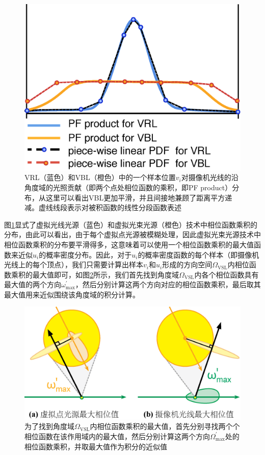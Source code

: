 \begin{figure}
	\sidecaption
	\includegraphics[width=.5\textwidth]{figures/ir/vbl-piece-wise-sampling}
	\caption{VRL（蓝色）和VBL（橙色）中的一个样本位置$v_i$对摄像机光线的沿角度域的光照贡献（即两个点处相位函数的乘积，即PF product）分布，从这里可以看出VBL更加平滑，并且间接地兼顾了距离平方递减。虚线线段表示对被积函数的线性分段函数表述}
	\label{f:ir-vbl-piece-wise-sampling}
\end{figure}

图\ref{f:ir-vbl-piece-wise-sampling}显式了虚拟光线光源（蓝色）和虚拟光束光源（橙色）技术中相位函数乘积的分布，由此可以看出，由于每个虚拟点光源被模糊处理，因此虚拟光束光源技术中相位函数乘积的分布要平滑得多，这意味着可以使用一个相位函数乘积的最大值函数来近似$u_i$的概率密度分布。因此，对于$u_i$的概率密度函数的每个样本（即摄像机光线上的每个顶点），我们只需要计算出样本$v_i$和$u_i$形成的方向空间$\Omega_{\text{VSL}}$内相位函数乘积的最大值即可，如图\ref{f:ir-vbl-sampling}所示，我们首先找到角度域$\Omega_{\text{VSL}}$内各个相位函数具有最大值的两个方向$\omega^{'}_{\max}$，然后分别计算这两个方向对应的相位函数乘积，最后取其最大值用来近似围绕该角度域的积分计算。

\begin{figure}
	\sidecaption
	\includegraphics[width=.65\textwidth]{figures/ir/vbl-sampling}
	\caption{为了找到角度域$\Omega_{\text{VSL}}$内相位函数乘积的最大值，首先分别寻找两个个相位函数在该作用域内的最大值，然后分别计算这两个方向$\Omega^{'}_{\max}$处的相位函数乘积，并取最大值作为积分的近似值}
	\label{f:ir-vbl-sampling}
\end{figure}


